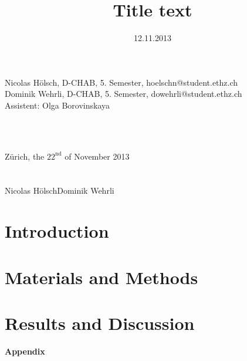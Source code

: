 \documentclass{article}
\title{Title text}
\date{12.11.2013}
\begin{document}
\begin{titlepage}


\maketitle

\begin{center}
Nicolas Hölsch, D-CHAB, 5. Semester, hoelschn@student.ethz.ch\\
Dominik Wehrli, D-CHAB, 5. Semester, dowehrli@student.ethz.ch\\
\vspace{15pt}
Assistent: Olga Borovinskaya
\end{center}


\hfill\\\\


Zürich, the $22^{\text{nd}}$ of November 2013 \\
\\
\\

Nicolas HölschDominik Wehrli

\end{titlepage}

\section{Introduction}

\section{Materials and Methods}

\section{Results and Discussion}

\begin{thebibliography}{}
	
\end{thebibliography}

\newpage\pagestyle{empty}
{\Large \bfseries Appendix}\\
\end{document}
